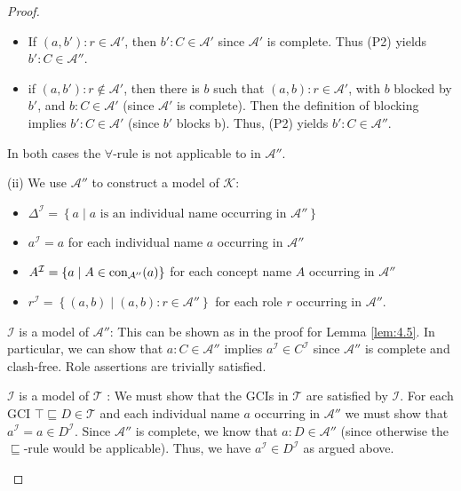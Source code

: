 \begin{proof}
\begin{enumerate}
\begin{subproof}
\begin{itemize}
						\begin{itemize}
							\item If $\left( a,b' \right):r \in \mathcal{A}'$, then $b':C \in \mathcal{A}'$ since $\mathcal{A'}$ is complete.
								Thus (P2) yields $b' :C \in \mathcal{A}''$.
							\item if $\left( a,b' \right):r \notin \mathcal{A}'$, then there is $b$ such that
								$\left( a,b \right):r \in \mathcal{A}'$, with $b$ blocked by $b'$,
								and $b:C \in \mathcal{A}'$ (since $\mathcal{A}'$ is complete).
								Then the definition of blocking implies $b':C \in \mathcal{A}'$ (since $b'$ blocks b).
								Thus, (P2) yields $b':C \in \mathcal{A}''$.
						\end{itemize}
						In both cases the $\forall$-rule is not applicable to in $\mathcal{A}''$.
						\qedhere
				\end{itemize}
			\end{subproof}
	\end{enumerate}
	(ii) We use $\mathcal{A}''$ to construct a model of $\mathcal{K}$:
	\begin{itemize}
		\item $\Delta^\mathcal{I} = \left\{ a \mid a \text{ is an individual name occurring in $\mathcal{A}''$} \right\}$
			\item $a^\mathcal{I} = a$ for each individual name $a$ occurring in $\mathcal{A}''$ 
			\item $A^\mathcal{I} = \left\{ a \mid A \in \operatorname{\text{con}}_{\mathcal{A}''}(a) \right\}$ for each concept name $A$ occurring in $\mathcal{A}''$ 
			\item $r^\mathcal{I} = \left\{ (a,b) \mid (a,b):r \in \mathcal{A}'' \right\}$ for each role $r$ occurring in $\mathcal{A}''$.
	\end{itemize}
	\begin{subproof}
		$\mathcal{I}$ is a model of $\mathcal{A}''$: This can be shown as in the proof for Lemma \ref{lem:4.5}.
		In particular, we can show that $a : C \in \mathcal{A}''$ implies $a^\mathcal{I} \in C^\mathcal{I}$
		since $\mathcal{A}''$ is complete and clash-free.
		Role assertions are trivially satisfied.

		$\mathcal{I}$ is a model of $\mathcal{T}$ : We must show that the GCIs in $\mathcal{T}$ are satisfied by $\mathcal{I}$.
		For each GCI $\top \sqsubseteq D \in \mathcal{T}$ and
		each individual name $a$ occurring in $\mathcal{A}''$ we must show that $a^\mathcal{I}=a \in D^\mathcal{I}$.
		Since $\mathcal{A}''$ is complete, we know that $a:D \in \mathcal{A}''$
		(since otherwise the $\sqsubseteq$-rule would be applicable).
		Thus, we have $a^\mathcal{I} \in D^\mathcal{I}$ as argued above.
		\qedhere
	\end{subproof}
\end{proof}
